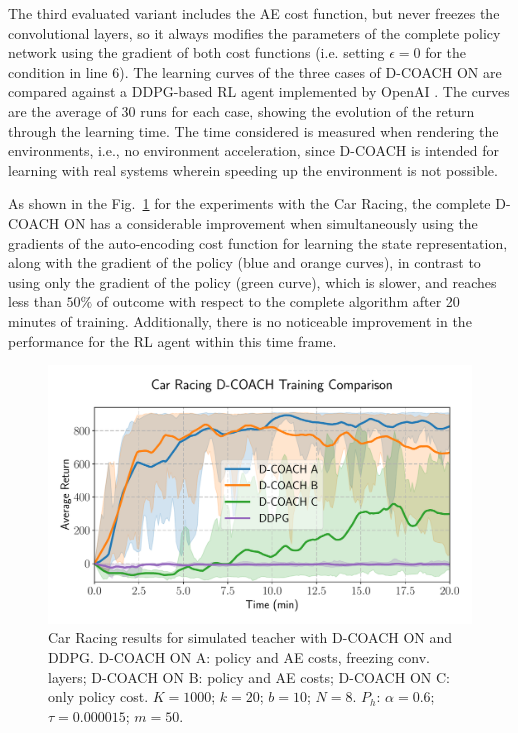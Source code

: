 The third evaluated variant includes the AE cost function, but never freezes the convolutional layers, so it always modifies the parameters of the complete policy network using the gradient of both cost functions (i.e. setting $\epsilon=0$ for the condition in line 6). The learning curves of the three cases of D-COACH ON are compared against a DDPG-based RL agent \cite{Lillicrap2015} implemented by OpenAI \cite{baselines}. The curves are the average of 30 runs for each case, showing the evolution of the return through the learning time. The time considered is measured when rendering the environments, i.e., no environment acceleration, since D-COACH is intended for learning with real systems wherein speeding up the environment is not possible.

As shown in the Fig.~\ref{fig:simulatedteachers} for the experiments with the Car Racing, the complete D-COACH ON has a considerable improvement when simultaneously using the gradients of the auto-encoding cost function for learning the state representation, along with the gradient of the policy  (blue and orange curves), in contrast to using only the gradient of the policy (green curve), which is slower, and reaches less than $50\%$ of outcome with respect to the complete algorithm after 20 minutes of training. Additionally, there is no noticeable improvement in the performance for the RL agent within this time frame.

\begin{figure}[h]
    \centering
    \includegraphics[width=0.9\linewidth]{imagenes/cap3/car_racing_sim_ICRA.pdf}
    \caption{Car Racing results for simulated teacher with D-COACH ON and DDPG. D-COACH ON A: policy and AE costs, freezing conv. layers; D-COACH ON B: policy and AE costs; D-COACH ON C: only policy cost. $K = 1000$; $k=20$; $b = 10$; $N = 8$. $P_{h}$: $\alpha = 0.6$; $\tau = 0.000015$; $m=50$.}
    \label{fig:simulatedteachers}
\end{figure}

